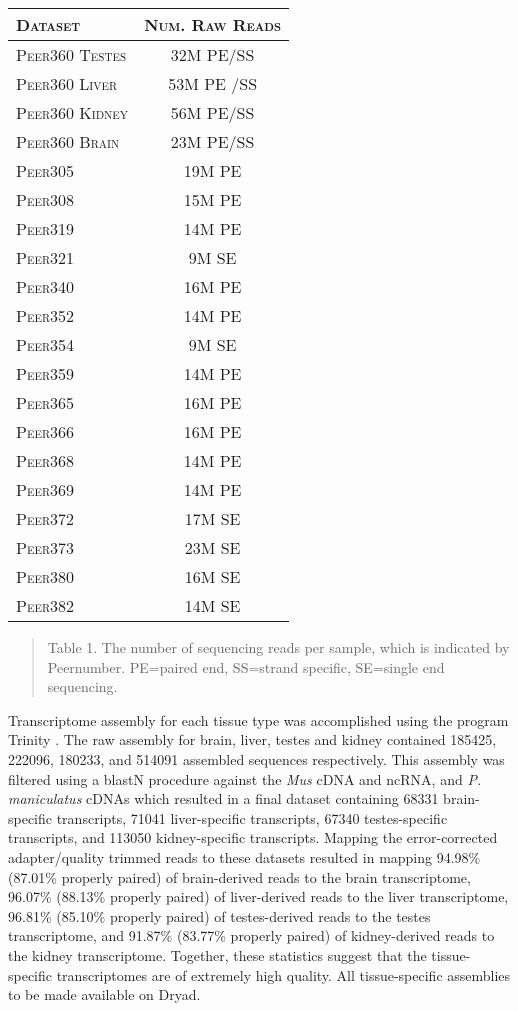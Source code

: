 \documentclass[11pt]{article}
\begin{document}
\begin{center}
\begin{tabular}{l|c }
\textsc{Dataset}& \textsc{Num. Raw Reads} \\
\hline 
\textsc{Peer360 Testes} & 32M PE/SS  \\
\textsc{Peer360 Liver} & 53M PE /SS  \\
\textsc{Peer360 Kidney} & 56M PE/SS   \\
\textsc{Peer360 Brain}  & 23M PE/SS \\
\textsc{Peer305}  & 19M PE  \\
\textsc{Peer308}  & 15M PE  \\
\textsc{Peer319}  & 14M PE  \\
\textsc{Peer321}  & 9M SE  \\
\textsc{Peer340}  & 16M PE  \\
\textsc{Peer352}  & 14M PE  \\
\textsc{Peer354}  & 9M SE  \\
\textsc{Peer359}  & 14M PE  \\
\textsc{Peer365}  & 16M PE \\
\textsc{Peer366}  & 16M PE  \\
\textsc{Peer368}  & 14M PE  \\
\textsc{Peer369}  & 14M PE  \\
\textsc{Peer372}  & 17M SE  \\
\textsc{Peer373}  & 23M SE  \\
\textsc{Peer380}  & 16M SE  \\
\textsc{Peer382}  & 14M SE  \\
\end{tabular}
\begin{quote}
\small{Table 1. The number of sequencing reads per sample, which is indicated by Peer{number}. PE=paired end, SS=strand specific, SE=single end sequencing. }
\end{quote}
\end{center}

Transcriptome assembly for each tissue type was accomplished using the program Trinity \cite{Haas:2013jq}. The raw assembly for brain, liver, testes and kidney contained 185425, 222096, 180233, and 514091 assembled sequences respectively. This assembly was filtered using a blastN procedure against the \textit{Mus} cDNA and ncRNA, and \textit{P. maniculatus} cDNAs which resulted in a final dataset containing 68331 brain-specific transcripts, 71041 liver-specific transcripts, 67340 testes-specific transcripts, and 113050 kidney-specific transcripts. Mapping the error-corrected adapter/quality trimmed reads to these datasets resulted in mapping 94.98\% (87.01\% properly paired) of brain-derived reads to the brain transcriptome, 96.07\% (88.13\% properly paired) of liver-derived reads to the liver transcriptome, 96.81\% (85.10\% properly paired) of testes-derived reads to the testes transcriptome, and 91.87\% (83.77\% properly paired) of kidney-derived reads to the kidney transcriptome. Together, these statistics suggest that the tissue-specific transcriptomes are of extremely high quality. All tissue-specific assemblies to be made available on Dryad. \\
\end{document}
